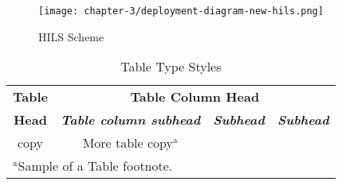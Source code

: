 \begin{figure}[htbp]
	\centerline{\texttt{[image: chapter-3/deployment-diagram-new-hils.png]}}
	\caption{HILS Scheme}
	\label{section-3-hils-deployment-diagram}
\end{figure}

\begin{table}[htbp]
	\caption{Table Type Styles}
	\label{tab1}
	\begin{center}
		\begin{tabular}{c c c c}
			\toprule
			\textbf{Table} & \multicolumn{3}{|c|}{\textbf{Table Column Head}}                                                         \\
			\cline{2-4}
			\textbf{Head}  & \textbf{\textit{Table column subhead}}           & \textbf{\textit{Subhead}} & \textbf{\textit{Subhead}} \\
			\midrule
			copy           & More table copy$^{\mathrm{a}}$                   &                           &                           \\
			\bottomrule
			\multicolumn{4}{l}{$^{\mathrm{a}}$Sample of a Table footnote.}
		\end{tabular}
	\end{center}
\end{table}